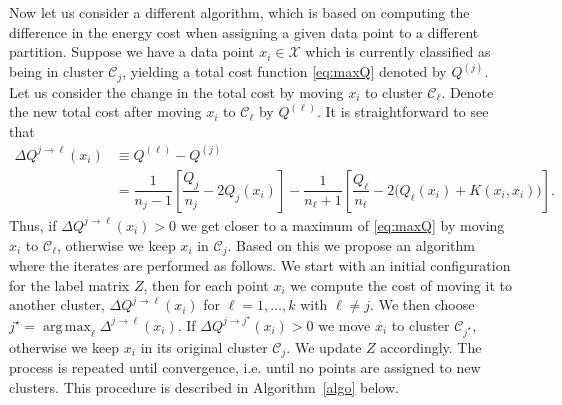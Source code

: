 \documentclass[aps,preprint,nofootinbib,floatfix]{revtex4-1}
\DeclareMathOperator*{\argmax}{arg\,max}
\newcommand\kk{K}
\newcommand\C{{\mathcal{C}}}
\begin{document}
Now let us consider a different algorithm, which is based on computing
the difference in the energy cost when assigning a given data point to
a different partition.
Suppose we have a data point $x_i \in \mathcal{X}$
which is currently classified as being in cluster $\C_j$, yielding
a total cost function \eqref{eq:maxQ} denoted by $Q^{(j)}$.
Let us consider the change in the total cost by moving
$x_i$ to cluster $\C_\ell$. 
Denote the new total cost after moving $x_i$ to $\C_\ell$ by $Q^{(\ell)}$.
It is straightforward to see that
\begin{equation}
\label{eq:changeQ}
\begin{split}
\Delta Q^{j \to \ell}(x_i) &\equiv Q^{(\ell)} - Q^{(j)} \\ 
&= 
\dfrac{1}{n_j - 1}\left[ \dfrac{Q_j}{n_j} - 2 Q_j(x_i) \right]
- \dfrac{1}{n_\ell + 1}\left[ \dfrac{Q_\ell}{n_\ell} - 2 \big(Q_\ell(x_i) + 
\kk(x_i,x_i)\big) 
\right].
\end{split}
\end{equation}
Thus, if $\Delta Q^{j\to \ell}(x_i) > 0$ we get closer to a 
maximum of \eqref{eq:maxQ} by
moving $x_i$ to $\C_\ell$, otherwise we keep $x_i$ in $\C_j$. Based on
this we propose an algorithm where
the iterates are performed as follows.
We start with an initial configuration for the label matrix $Z$, 
then for each
point $x_i$ 
we compute the cost of moving it to another cluster,
$\Delta Q^{j\to \ell}(x_i)$ for 
$\ell=1,\dots,k$ with $\ell \ne j$. 
We then choose $j^\star = \argmax_\ell \Delta^{j \to \ell}(x_i)$.
If $\Delta Q^{j \to j^\star}(x_i) > 0$ 
we move $x_i$ to cluster $\C_{j^\star}$, otherwise 
we keep $x_i$ in its original cluster $\C_j$. We update $Z$ accordingly.
The process is repeated
until convergence, i.e. until no points are assigned to new clusters. 
This procedure is described in Algorithm~\ref{algo} below.
\end{document}
